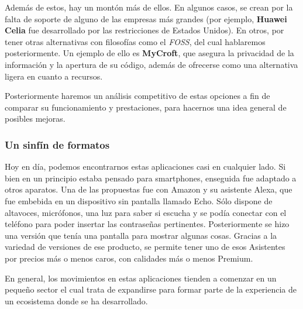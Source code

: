 Además de estos, hay un montón más de ellos. En algunos casos, se crean por la falta de soporte de alguno de las empresas más grandes (por ejemplo, \textbf{Huawei Celia} fue desarrollado por las restricciones de Estados Unidos). En otros, por tener otras alternativas con filosofías como el \textit{FOSS}, del cual hablaremos posteriormente. Un ejemplo de ello es \textbf{MyCroft}, que asegura la privacidad de la información y la apertura de su código, además de ofrecerse como una alternativa ligera en cuanto a recursos.

Posteriormente haremos un análisis competitivo de estas opciones a fin de comparar su funcionamiento y prestaciones, para hacernos una idea general de posibles mejoras.


\subsubsection{Un sinfín de formatos}
Hoy en día, podemos encontrarnos estas aplicaciones casi en cualquier lado. Si bien en un principio estaba pensado para smartphones, enseguida fue adaptado a otros aparatos.
Una de las propuestas fue con Amazon y su asistente Alexa, que fue embebida en un dispositivo sin pantalla llamado Echo. Sólo dispone de altavoces, micrófonos, una luz para saber si escucha y se podía conectar con el teléfono para poder insertar las contraseñas pertinentes. Posteriormente se hizo una versión que tenía una pantalla para mostrar algunas cosas.
Gracias a la variedad de versiones de ese producto, se permite tener uno de esos Asistentes por precios más o menos caros, con calidades más o menos Premium.

En general, los movimientos en estas aplicaciones tienden a comenzar en un pequeño sector el cual trata de expandirse para formar parte de la experiencia de un ecosistema donde se ha desarrollado.

